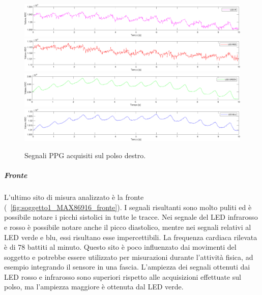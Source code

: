 \begin{figure}[h]
	\centering
	\includegraphics[width=1\linewidth]{ImageFiles/Misure Preliminari/Soggetto 1/MAX86916/polso_ired}
	\includegraphics[width=1\linewidth]{ImageFiles/Misure Preliminari/Soggetto 1/MAX86916/polso_red}
	\includegraphics[width=1\linewidth]{ImageFiles/Misure Preliminari/Soggetto 1/MAX86916/polso_green}
	\includegraphics[width=1\linewidth]{ImageFiles/Misure Preliminari/Soggetto 1/MAX86916/polso_blu}
	\caption{Segnali PPG acquisiti sul polso destro.}
	\label{fig:soggetto1_MAX86916_polso}
\end{figure}

\clearpage

\subparagraph{Fronte}

L'ultimo sito di misura analizzato è la fronte (\Fig~\ref{fig:soggetto1_MAX86916_fronte}). I segnali risultanti sono molto puliti ed è possibile notare i picchi sistolici in tutte le tracce. Nei segnale del LED infrarosso e rosso è possibile notare anche il picco diastolico, mentre nei segnali relativi al LED verde e blu, essi risultano esse impercettibili. La frequenza cardiaca rilevata è di 78 battiti al minuto. Questo sito è poco influenzato dai movimenti del soggetto e potrebbe essere utilizzato per misurazioni durante l'attività fisica, ad esempio integrando il sensore in una fascia. L'ampiezza dei segnali ottenuti dai LED rosso e infrarosso sono superiori rispetto alle acquisizioni effettuate sul polso, ma l'ampiezza maggiore è ottenuta dal LED verde.

